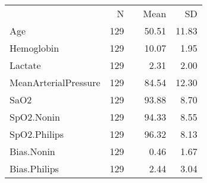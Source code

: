 \documentclass{article}
\begin{document}
\begin{center}
\begin{tabular}{lrrrr}
  \toprule
   & N &   & Mean & SD \\ 
    \cmidrule{2-2}  \cmidrule{4-5}
 Age & 129 &  & 50.51 & 11.83 \\ 
  Hemoglobin & 129 &  & 10.07 & 1.95 \\ 
  Lactate & 129 &  & 2.31 & 2.00 \\ 
  MeanArterialPressure & 129 &  & 84.54 & 12.30 \\ 
  SaO2 & 129 &  & 93.88 & 8.70 \\ 
  SpO2.Nonin & 129 &  & 94.33 & 8.55 \\ 
  SpO2.Philips & 129 &  & 96.32 & 8.13 \\ 
  Bias.Nonin & 129 &  & 0.46 & 1.67 \\ 
  Bias.Philips & 129 &  & 2.44 & 3.04 \\ 
   \bottomrule
\end{tabular}
\end{center}
\end{document}
